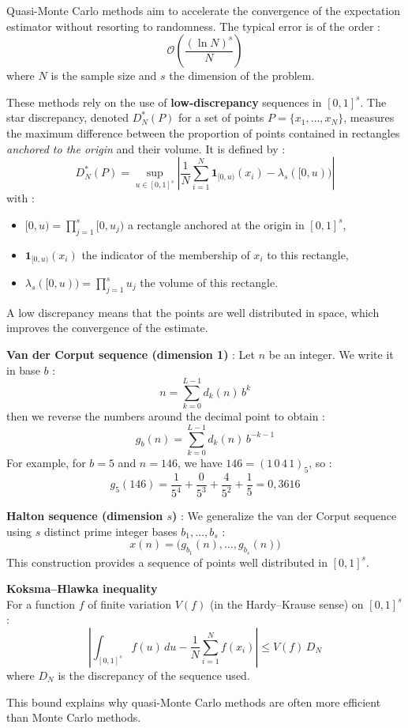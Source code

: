 %
\begin{f}
	
	Quasi-Monte Carlo methods aim to accelerate the convergence of the expectation estimator without resorting to randomness. The typical error is of the order :
	\[
	\mathcal{O}\left( \frac{(\ln N)^s}{N} \right)
	\]
	where \(N\) is the sample size and \(s\) the dimension of the problem.
	
	These methods rely on the use of \textbf{low-discrepancy} sequences in \([0,1]^s\). The star discrepancy, denoted \(D^*_N(P)\) for a set of points \(P = \{x_1, \ldots, x_N\}\), measures the maximum difference between the proportion of points contained in rectangles \emph{anchored to the origin} and their volume. It is defined by :
	\[
	D^*_N(P) = \sup_{u \in [0,1]^s} \left| \frac{1}{N} \sum_{i=1}^N \mathbf{1}_{[0,u)}(x_i) - \lambda_s([0,u)) \right|
	\]
	with :
	\begin{itemize}
		\item \([0,u) = \prod_{j=1}^s [0, u_j)\) a rectangle anchored at the origin in \([0,1]^s\),
		\item \(\mathbf{1}_{[0,u)}(x_i)\) the indicator of the membership of \(x_i\) to this rectangle,
		\item \(\lambda_s([0,u)) = \prod_{j=1}^s u_j\) the volume of this rectangle.
	\end{itemize}
	A low discrepancy means that the points are well distributed in space, which improves the convergence of the estimate.
	
	\medskip
	\textbf{Van der Corput sequence (dimension 1)} :
	Let \(n\) be an integer. We write it in base \(b\) :
	\[
	n = \sum_{k=0}^{L-1} d_k(n)\, b^k
	\]
	then we reverse the numbers around the decimal point to obtain :
	\[
	g_b(n) = \sum_{k=0}^{L-1} d_k(n)\, b^{-k-1}
	\]
	For example, for \(b = 5\) and \(n = 146\), we have \(146 = (1\,0\,4\,1)_5\), so :
	\[
	g_5(146) = \frac{1}{5^4} + \frac{0}{5^3} + \frac{4}{5^2} + \frac{1}{5} = 0{,}3616
	\]
	
	\medskip
	\textbf{Halton sequence (dimension \(s\))} :
	We generalize the van der Corput sequence using \(s\) distinct prime integer bases \(b_1, \dots, b_s\) :
	\[
	x(n) = \big( g_{b_1}(n), \dots, g_{b_s}(n) \big)
	\]
	This construction provides a sequence of points well distributed in \([0,1]^s\).
	
	\medskip
	\textbf{Koksma–Hlawka inequality}\\
	For a function \(f\) of finite variation \(V(f)\) (in the Hardy–Krause sense) on \([0,1]^s\) :
	\[
	\left| \int_{[0,1]^s} f(u)\, du - \frac{1}{N} \sum_{i=1}^N f(x_i) \right| \leq V(f)\, D_N
	\]
	where \(D_N\) is the discrepancy of the sequence used.
	
This bound explains why quasi-Monte Carlo methods are often more efficient than Monte Carlo methods.
	
	
\end{f}
